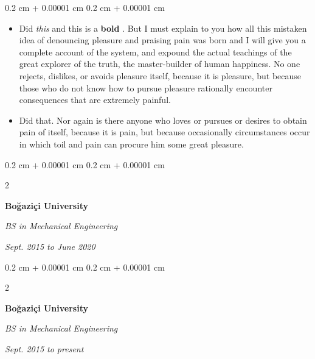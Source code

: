 \documentclass[10pt, letterpaper]{article}
\newenvironment{highlights}{
    \begin{itemize}[
        topsep=0.10 cm,
        parsep=0.10 cm,
        partopsep=0pt,
        itemsep=0pt,
        leftmargin=0.4 cm + 10pt
    ]
}{
    \end{itemize}
} %
\newenvironment{onecolentry}{
    \begin{adjustwidth}{
        0.2 cm + 0.00001 cm
    }{
        0.2 cm + 0.00001 cm
    }
}{
    \end{adjustwidth}
} %
\newenvironment{twocolentry}[2][]{
    \onecolentry
    \def\secondColumn{#2}
    \setcolumnwidth{\fill, 4.5 cm}
    \begin{paracol}{2}
}{
    \switchcolumn \raggedleft \secondColumn
    \end{paracol}
    \endonecolentry
} %
\let\hrefWithoutArrow\href
\renewcommand{\href}[2]{\hrefWithoutArrow{#1}{\mbox{\ifthenelse{\equal{#2}{}}{ }{#2 }\raisebox{.15ex}{\footnotesize \faExternalLink*}}}}
\begin{document}
        \vspace{0.10 cm-3px}
        \begin{onecolentry}
            \begin{highlights}
                \item Did \textit{this} and this is a \textbf{bold} \href{https://example.com}{link}. But I must explain to you how all this mistaken idea of denouncing pleasure and praising pain was born and I will give you a complete account of the system, and expound the actual teachings of the great explorer of the truth, the master-builder of human happiness. No one rejects, dislikes, or avoids pleasure itself, because it is pleasure, but because those who do not know how to pursue pleasure rationally encounter consequences that are extremely painful.
                \item Did that. Nor again is there anyone who loves or pursues or desires to obtain pain of itself, because it is pain, but because occasionally circumstances occur in which toil and pain can procure him some great pleasure.
            \end{highlights}
        \end{onecolentry}


        \vspace{0.2 cm-3px}

        \begin{twocolentry}{
            
            
        \textit{Sept. 2015 to June 2020}}
            \textbf{Boğaziçi University}

            \textit{BS in Mechanical Engineering}
        \end{twocolentry}



        \vspace{0.2 cm-3px}

        \begin{twocolentry}{
            
            
        \textit{Sept. 2015 to present}}
            \textbf{Boğaziçi University}

            \textit{BS in Mechanical Engineering}
        \end{twocolentry}
\end{document}
